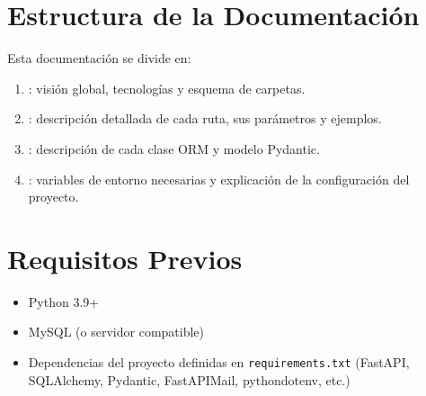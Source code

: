 \documentclass[a4paper,11pt,spanish]{sphinxmanual}
\newcommand{\robotoMonoBold}{\fontseries{b}\selectfont\ttfamily}
\renewcommand{\sphinxcode}[1]{\textcolor{sphinxorangeCode}{{\robotoMonoBold #1}}}
\renewcommand{\sphinxupquote}[1]{\texttt{#1}}
\begin{document}
\section{Estructura de la Documentación}
\label{\detokenize{introduccion:estructura-de-la-documentacion}}
\sphinxAtStartPar
Esta documentación se divide en:
\begin{enumerate}
%
\item {} 
\sphinxAtStartPar
{}: visión global, tecnologías y esquema de carpetas.

\item {} 
\sphinxAtStartPar
{}: descripción detallada de cada ruta, sus parámetros y ejemplos.

\item {} 
\sphinxAtStartPar
{}: descripción de cada clase ORM y modelo Pydantic.

\item {} 
\sphinxAtStartPar
{}: variables de entorno necesarias y explicación de la configuración del proyecto.

\end{enumerate}


\section{Requisitos Previos}
\label{\detokenize{introduccion:requisitos-previos}}\begin{itemize}
\item {} 
\sphinxAtStartPar
Python 3.9+

\item {} 
\sphinxAtStartPar
MySQL (o servidor compatible)

\item {} 
\sphinxAtStartPar
Dependencias del proyecto definidas en \sphinxcode{\sphinxupquote{requirements.txt}} (FastAPI, SQLAlchemy, Pydantic, FastAPI\sphinxhyphen{}Mail, python\sphinxhyphen{}dotenv, etc.)

\end{itemize}
\end{document}
